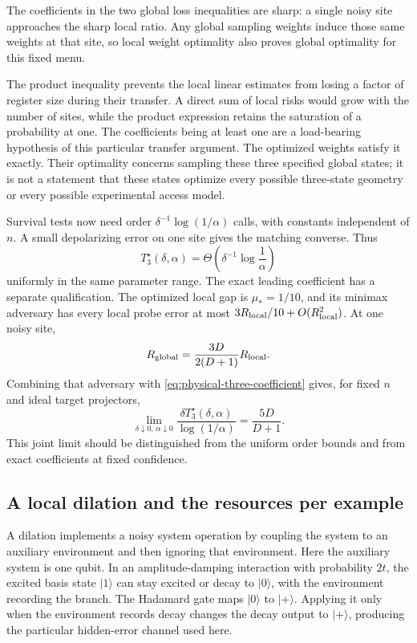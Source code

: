 \documentclass[11pt,a4paper]{article}
\newcommand{\ket}[1]{\lvert #1\rangle}
\numberwithin{equation}{section}
\begin{document}
The coefficients in the two global loss inequalities are sharp: a single noisy site approaches the sharp local ratio. Any global sampling weights induce those same weights at that site, so local weight optimality also proves global optimality for this fixed menu.

The product inequality prevents the local linear estimates from losing a factor of register size during their transfer. A direct sum of local risks would grow with the number of sites, while the product expression retains the saturation of a probability at one. The coefficients being at least one are a load-bearing hypothesis of this particular transfer argument. The optimized weights satisfy it exactly. Their optimality concerns sampling these three specified global states; it is not a statement that these states optimize every possible three-state geometry or every possible experimental access model.

Survival tests now need order $\delta^{-1}\log(1/\alpha)$ calls, with constants independent of $n$. A small depolarizing error on one site gives the matching converse. Thus
\[
 T_3^\star(\delta,\alpha)
 =\Theta\!\left(\delta^{-1}\log\frac1\alpha\right)
\]
uniformly in the same parameter range. The exact leading coefficient has a separate qualification. The optimized local gap is $\mu_*=1/10$, and its minimax adversary has every local probe error at most $3R_{\rm local}/10+O(R_{\rm local}^2)$. At one noisy site,
\[
 R_{\rm global}=\frac{3D}{2(D+1)}R_{\rm local}.
\]
Combining that adversary with \eqref{eq:physical-three-coefficient} gives, for fixed $n$ and ideal target projectors,
\[
 \lim_{\delta\downarrow0,\,\alpha\downarrow0}
 \frac{\delta T_3^\star(\delta,\alpha)}{\log(1/\alpha)}
 =\frac{5D}{D+1}.
\]
This joint limit should be distinguished from the uniform order bounds and from exact coefficients at fixed confidence.

\subsection{A local dilation and the resources per example}

A dilation implements a noisy system operation by coupling the system
to an auxiliary environment and then ignoring that environment. Here the
auxiliary system is one qubit. In an amplitude-damping interaction with probability $2t$, the excited basis state $\ket1$ can stay excited or decay to $\ket0$, with the environment recording the branch. The Hadamard gate maps $\ket0$ to $\ket+$.
Applying it only when the environment records decay changes the decay
output to $\ket+$, producing the particular hidden-error channel used here.
\end{document}
